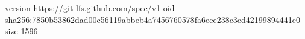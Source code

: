 version https://git-lfs.github.com/spec/v1
oid sha256:7850b53862dad00c56119abbeb4a7456760578fa6eee238c3cd42199894441e0
size 1596
